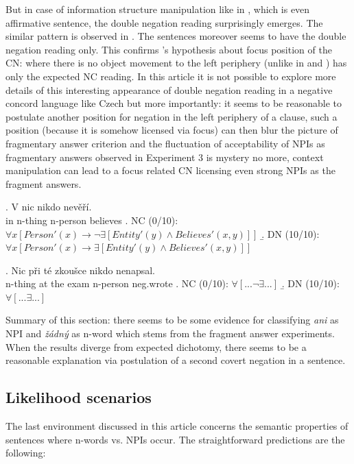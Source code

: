 \documentclass[12pt]{scrartcl}
\begin{document}
But in case of information structure manipulation like in \Next, which is even affirmative sentence, the double negation reading surprisingly emerges. The similar pattern is observed in \NNext. The sentences moreover seems to have the double negation reading only. This confirms \citeauthor{fualuaus2016fragment}'s hypothesis about focus position of the CN: \Last where there is no object movement to the left periphery (unlike in \Next and \NNext) has only the expected NC reading. In this article it is not possible to explore more details of this interesting appearance of double negation reading in a negative concord language like Czech but more importantly: it seems to be reasonable to postulate another position for negation in the left periphery of a clause, such a position (because it is somehow licensed via focus) can then blur the picture of fragmentary answer criterion and the fluctuation of acceptability of NPIs as fragmentary answers observed in Experiment 3 is mystery no more, context manipulation can lead to a focus related CN licensing even strong NPIs as the fragment answers.

\ex. V nic nikdo nevěří.\\
in n-thing n-person believes \a. NC (0/10):
\(\forall x[Person'(x) \rightarrow \neg \exists[Entity'(y) \wedge Believes'(x,y)]]\)
\b. DN (10/10):
\(\forall x[Person'(x) \rightarrow \exists[Entity'(y) \wedge Believes'(x,y)]]\)


\ex. Nic při té zkoušce nikdo nenapsal.\\
n-thing at the exam n-person neg.wrote \a. NC (0/10):
\(\forall [... \neg \exists ...]\) \b. DN (10/10):
\(\forall [... \exists ...]\)

Summary of this section: there seems to be some evidence for classifying \textit{ani} as NPI and \textit{žádný} as n-word which stems from the fragment answer experiments. When the results diverge from expected dichotomy, there seems to be a reasonable explanation via postulation of a second covert negation in a sentence.

\hypertarget{likelihood-scenarios}{%
\subsection{Likelihood scenarios}\label{likelihood-scenarios}}

The last environment discussed in this article concerns the semantic properties of sentences where n-words vs. NPIs occur. The straightforward predictions are the following:
\end{document}
